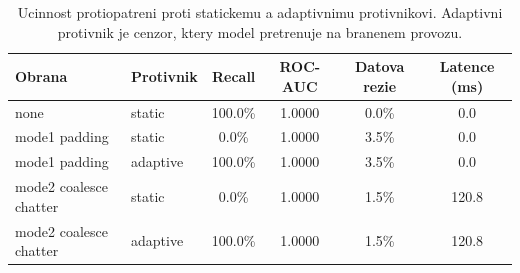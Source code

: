 \begin{table}[htbp]
\centering
\caption{Ucinnost protiopatreni proti statickemu a adaptivnimu protivnikovi. Adaptivni protivnik je cenzor, ktery model pretrenuje na branenem provozu.}
\label{tab:before_after_defense}
\begin{tabular}{llcccc}
\hline
\textbf{Obrana} & \textbf{Protivnik} & \textbf{Recall} & \textbf{ROC-AUC} & \textbf{Datova rezie} & \textbf{Latence (ms)} \\
\hline
none & static & 100.0\% & 1.0000 & 0.0\% & 0.0 \\
mode1 padding & static & 0.0\% & 1.0000 & 3.5\% & 0.0 \\
mode1 padding & adaptive & 100.0\% & 1.0000 & 3.5\% & 0.0 \\
mode2 coalesce chatter & static & 0.0\% & 1.0000 & 1.5\% & 120.8 \\
mode2 coalesce chatter & adaptive & 100.0\% & 1.0000 & 1.5\% & 120.8 \\
\hline
\end{tabular}
\end{table}
